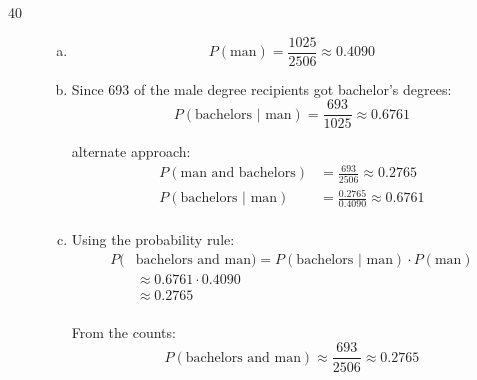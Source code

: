 \documentclass[letterpaper, landscape]{exam}
\begin{document}
\begin{description}
      \item[40]
        \begin{enumerate}[(a)]
          \item 
            \[
              P(\text{man}) = \frac{1025}{2506} \approx \boxed{ 0.4090 }
            \]

          \item

            Since 693 of the male degree recipients got bachelor's degrees:
            \[
              P( \text{bachelors } | \text { man} ) = \frac{693}{1025} 
                \approx \boxed{ 0.6761 } 
            \]

            alternate approach:
            \begin{align*}
              P( \text{man and bachelors} )         & = \frac{693}{2506} \approx 0.2765 \\
              P( \text{bachelors } | \text { man} ) & = \frac{0.2765}{0.4090}
                \approx 0.6761 \\
            \end{align*}
          \item Using the probability rule:
            \begin{align*}
              P( & \text{bachelors and man}) = 
                P( \text{bachelors } | \text { man} ) \cdot P( \text{man} ) \\
                & \approx 0.6761 \cdot 0.4090  \\
                & \approx \boxed{ 0.2765 }  \\
            \end{align*}

            From the counts:
            \[
              P( \text{bachelors and man}) \approx \frac{693}{2506} \approx 0.2765 
            \]

        \end{enumerate}





\end{description}
\end{document}

